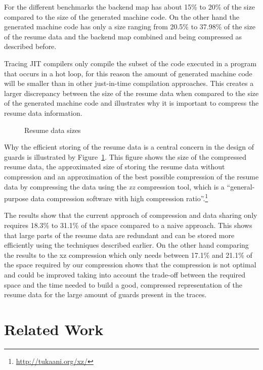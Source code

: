 \documentclass[10pt,preprint]{sigplanconf}
\begin{document}
For the different benchmarks the backend map has
about 15\% to 20\% of the size compared to the size of the
generated machine code. On the other hand the generated machine code has only a
size ranging from 20.5\% to 37.98\% of the size of the resume data and the backend map
combined and being compressed as described before.

Tracing JIT compilers only compile the subset of the code executed in a program
that occurs in a hot loop, for this reason the amount of generated machine
code will be smaller than in other just-in-time compilation approaches.  This
creates a larger discrepancy between the size of the resume data when
compared to the size of the generated machine code and illustrates why it is important to compress the resume data information.

\begin{figure}
    
    \caption{Resume data sizes}
    \label{fig:resume_data_sizes}
\end{figure}

Why the efficient storing of the resume data is a central concern in the design
of guards is illustrated by Figure~\ref{fig:resume_data_sizes}. This figure shows
the size of the compressed resume data, the approximated size of
storing the resume data without compression and
an approximation of the best possible compression of the resume data by
compressing the data using the
\emph{xz} compression tool, which is a ``general-purpose data compression
software with high compression ratio''.\footnote{\url{http://tukaani.org/xz/}}

The results show that the current approach of compression and data sharing only
requires 18.3\% to 31.1\% of the space compared to a naive approach. This
shows that large parts of the resume data are redundant and can be stored more
efficiently using the techniques described earlier. On the other hand
comparing the results to the xz compression which only needs between 17.1\%
and 21.1\% of the space required by our compression shows that the compression
is not optimal and could be improved taking into account the trade-off between
the required space and the time needed to build a good, compressed
representation of the resume data for the large amount of guards present in the
traces.

\section{Related Work}
\label{sec:Related Work}
\end{document}
